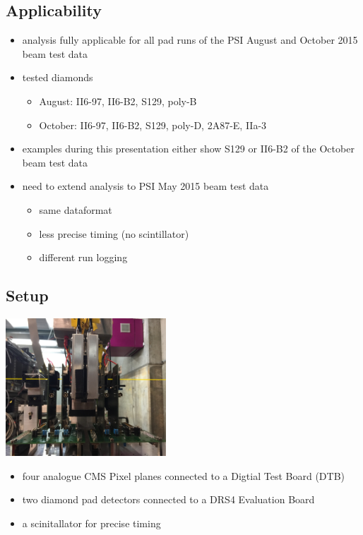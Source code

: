 \documentclass[9pt]{beamer}
\begin{document}
\subsection{Applicability}
\begin{frame}
	\begin{itemize}
		\setlength{\itemsep}{\fill}
		\item analysis fully applicable for all pad runs of the PSI August and October 2015 beam test data
		\item tested diamonds
		\begin{itemize}
			\item August: II6-97, II6-B2, S129, poly-B
			\item October: II6-97, II6-B2, S129, poly-D, 2A87-E, IIa-3
		\end{itemize}
		\item examples during this presentation either show S129 or II6-B2 of the October beam test data
		\item need to extend analysis to PSI May 2015 beam test data
		\begin{itemize}
			\item same dataformat
			\item less precise timing (no scintillator)
			\item different run logging
		\end{itemize}
	\end{itemize}
\end{frame}
\subsection{Setup}
\begin{frame}
	\begin{center}
		\includegraphics[width=6cm]{telescope3}
	\end{center}
	\begin{itemize}
		\item four analogue CMS Pixel planes connected to a Digtial Test Board (DTB)
		\item two diamond pad detectors connected to a DRS4 Evaluation Board
		\item a scinitallator for precise timing
	\end{itemize}
\end{frame}
\end{document}
